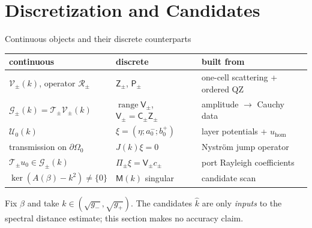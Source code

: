 \documentclass[aspectratio=169]{beamer}
\begin{document}
\section{Discretization and Candidates}

\begin{frame}{Continuous objects and their discrete counterparts}
  \small
  \centering
  \renewcommand{\arraystretch}{1.25}
  \begin{tabular}{lll}
    \toprule
    continuous & discrete & built from\\
    \midrule
    $\mathcal V_\pm(k)$, operator $\mathcal R_\pm$ &
      $\mathsf Z_\pm$, $\mathsf P_\pm$ & one-cell scattering + ordered QZ\\
    $\mathcal G_\pm(k)=\mathscr T_\pm\mathcal V_\pm(k)$ &
      $\operatorname{range}\mathsf V_\pm$, $\mathsf V_\pm=\mathsf C_\pm\mathsf Z_\pm$ &
      amplitude $\to$ Cauchy data\\
    $\mathcal U_0(k)$ &
      $\xi=(\eta;a^-_0;b^+_0)$ & layer potentials + $u_{\mathrm{hom}}$\\
    transmission on $\partial\Omega_0$ & $J(k)\xi=0$ & Nystr\"om jump operator\\
    $\mathscr T_\pm u_0\in\mathcal G_\pm(k)$ &
      $\Pi_\pm\xi=\mathsf V_\pm c_\pm$ & port Rayleigh coefficients\\
    $\ker(A(\beta)-k^2)\ne\{0\}$ & $\mathsf M(k)$ singular & candidate scan\\
    \bottomrule
  \end{tabular}

  \vspace{0.8em}
  \raggedright
  Fix $\beta$ and take $k\in(\sqrt{g_-},\sqrt{g_+})$. The candidates $\widehat k$ are only
  \emph{inputs} to the spectral distance estimate; this section makes no accuracy
  claim.
\end{frame}
\end{document}
